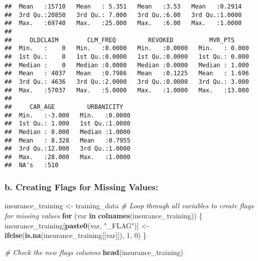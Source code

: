 \documentclass[
]{article}
\newenvironment{Shaded}{\begin{snugshade}}{\end{snugshade}}
\newcommand{\CommentTok}[1]{\textcolor[rgb]{0.56,0.35,0.01}{\textit{#1}}}
\newcommand{\ControlFlowTok}[1]{\textcolor[rgb]{0.13,0.29,0.53}{\textbf{#1}}}
\newcommand{\DecValTok}[1]{\textcolor[rgb]{0.00,0.00,0.81}{#1}}
\newcommand{\FunctionTok}[1]{\textcolor[rgb]{0.13,0.29,0.53}{\textbf{#1}}}
\newcommand{\NormalTok}[1]{#1}
\newcommand{\OtherTok}[1]{\textcolor[rgb]{0.56,0.35,0.01}{#1}}
\newcommand{\StringTok}[1]{\textcolor[rgb]{0.31,0.60,0.02}{#1}}
\begin{document}
\begin{verbatim}
##  Mean   :15710   Mean   : 5.351   Mean   :3.53   Mean   :0.2914  
##  3rd Qu.:20850   3rd Qu.: 7.000   3rd Qu.:6.00   3rd Qu.:1.0000  
##  Max.   :69740   Max.   :25.000   Max.   :6.00   Max.   :1.0000  
##                                                                  
##     OLDCLAIM        CLM_FREQ         REVOKED          MVR_PTS      
##  Min.   :    0   Min.   :0.0000   Min.   :0.0000   Min.   : 0.000  
##  1st Qu.:    0   1st Qu.:0.0000   1st Qu.:0.0000   1st Qu.: 0.000  
##  Median :    0   Median :0.0000   Median :0.0000   Median : 1.000  
##  Mean   : 4037   Mean   :0.7986   Mean   :0.1225   Mean   : 1.696  
##  3rd Qu.: 4636   3rd Qu.:2.0000   3rd Qu.:0.0000   3rd Qu.: 3.000  
##  Max.   :57037   Max.   :5.0000   Max.   :1.0000   Max.   :13.000  
##                                                                    
##     CAR_AGE         URBANICITY    
##  Min.   :-3.000   Min.   :0.0000  
##  1st Qu.: 1.000   1st Qu.:1.0000  
##  Median : 8.000   Median :1.0000  
##  Mean   : 8.328   Mean   :0.7955  
##  3rd Qu.:12.000   3rd Qu.:1.0000  
##  Max.   :28.000   Max.   :1.0000  
##  NA's   :510
\end{verbatim}

\subsubsection{b. Creating Flags for Missing
Values:}\label{b.-creating-flags-for-missing-values}

\begin{Shaded}
\begin{Highlighting}[]
\NormalTok{insurance\_training }\OtherTok{\textless{}{-}}\NormalTok{ training\_data}
\CommentTok{\# Loop through all variables to create flags for missing values}
\ControlFlowTok{for}\NormalTok{ (var }\ControlFlowTok{in} \FunctionTok{colnames}\NormalTok{(insurance\_training)) \{}
\NormalTok{  insurance\_training[}\FunctionTok{paste0}\NormalTok{(var, }\StringTok{"\_FLAG"}\NormalTok{)] }\OtherTok{\textless{}{-}} \FunctionTok{ifelse}\NormalTok{(}\FunctionTok{is.na}\NormalTok{(insurance\_training[[var]]), }\DecValTok{1}\NormalTok{, }\DecValTok{0}\NormalTok{)}
\NormalTok{\}}

\CommentTok{\# Check the new flags columns}
\FunctionTok{head}\NormalTok{(insurance\_training)}
\end{Highlighting}
\end{Shaded}
\end{document}
